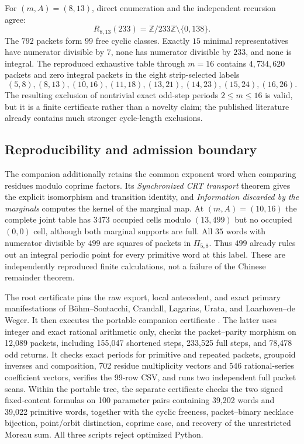 For $(m,A)=(8,13)$, direct enumeration and the independent recursion agree:
\[
 R_{8,13}(233)=\mathbb Z/233\mathbb Z\setminus\{0,138\}.
\]
The $792$ packets form $99$ free cyclic classes.  Exactly $15$ minimal
representatives have numerator divisible by $7$, none has numerator divisible
by $233$, and none is integral.  The reproduced exhaustive table through
$m=16$ contains $4{,}734{,}620$ packets and zero integral packets in the eight
strip-selected labels
\[
 (5,8),(8,13),(10,16),(11,18),(13,21),(14,23),(15,24),(16,26).
\]
The resulting exclusion of nontrivial exact odd-step periods $2\le m\le16$
is valid, but it is a finite certificate rather than a novelty claim; the
published literature already contains much stronger cycle-length exclusions.

\subsection{Reproducibility and admission boundary}

The companion additionally retains the common exponent word when comparing
residues modulo coprime factors.  Its \emph{Synchronized CRT transport}
theorem gives the explicit isomorphism and transition identity, and
\emph{Information discarded by the marginals} computes the kernel of the
marginal map.  At $(m,A)=(10,16)$ the complete joint table has $3473$
occupied cells modulo $(13,499)$ but no occupied $(0,0)$ cell, although both
marginal supports are full.  All $35$ words with numerator divisible by
$499$ are squares of packets in $\Pi_{5,8}$.  Thus $499$ already rules out
an integral periodic point for every primitive word at this label.
These are independently reproduced
finite calculations, not a failure of the Chinese remainder theorem.

The root certificate
 pins the raw
export, local antecedent, and exact primary manifestations of
B\"ohm--Sontacchi, Crandall, Lagarias, Urata, and Laarhoven--de Weger.  It
then executes the portable companion certificate
.
The latter uses integer and exact rational arithmetic only, checks the
packet--parity morphism on 12,089 packets, including 155,047 shortened steps,
233,525 full steps, and 78,478 odd returns.  It checks exact periods for
primitive and repeated packets, groupoid inverses and composition,
702 residue multiplicity vectors and 546 rational-series coefficient vectors,
verifies the 99-row CSV, and runs two independent full packet scans.
Within the portable  tree, the separate certificate
 checks the two signed
fixed-content formulas on 100 parameter pairs containing
39,202 words and 39,022 primitive words, together with the cyclic freeness,
packet--binary necklace bijection, point/orbit distinction, coprime case, and
recovery of the unrestricted Moreau sum.  All three scripts reject optimized
Python.

